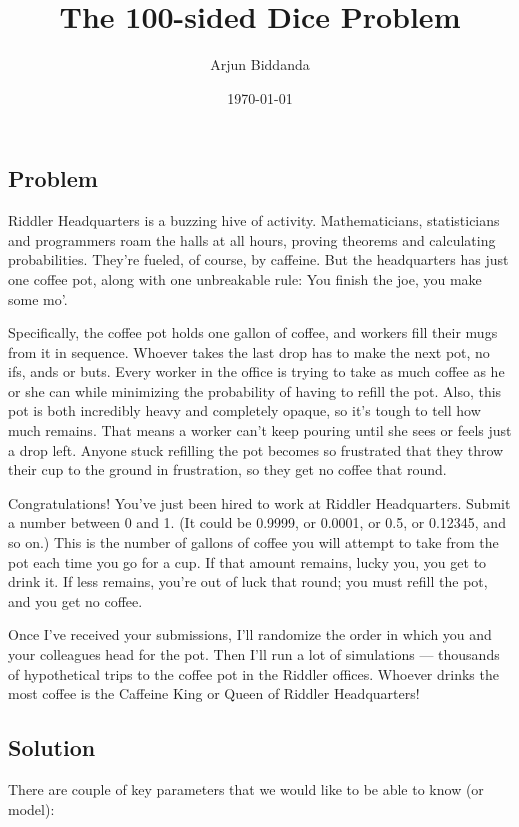 \documentclass[12pt]{article}
\title{The 100-sided Dice Problem}
\author{Arjun Biddanda}
\date{\today}
\begin{document}
\maketitle
\linenumbers

\subsection*{Problem}

Riddler Headquarters is a buzzing hive of activity. Mathematicians, statisticians and programmers roam the halls at all hours, proving theorems and calculating probabilities. They’re fueled, of course, by caffeine. But the headquarters has just one coffee pot, along with one unbreakable rule: You finish the joe, you make some mo’.

Specifically, the coffee pot holds one gallon of coffee, and workers fill their mugs from it in sequence. Whoever takes the last drop has to make the next pot, no ifs, ands or buts. Every worker in the office is trying to take as much coffee as he or she can while minimizing the probability of having to refill the pot. Also, this pot is both incredibly heavy and completely opaque, so it’s tough to tell how much remains. That means a worker can’t keep pouring until she sees or feels just a drop left. Anyone stuck refilling the pot becomes so frustrated that they throw their cup to the ground in frustration, so they get no coffee that round.

Congratulations! You’ve just been hired to work at Riddler Headquarters. Submit a number between 0 and 1. (It could be 0.9999, or 0.0001, or 0.5, or 0.12345, and so on.) This is the number of gallons of coffee you will attempt to take from the pot each time you go for a cup. If that amount remains, lucky you, you get to drink it. If less remains, you’re out of luck that round; you must refill the pot, and you get no coffee.

Once I’ve received your submissions, I’ll randomize the order in which you and your colleagues head for the pot. Then I’ll run a lot of simulations — thousands of hypothetical trips to the coffee pot in the Riddler offices. Whoever drinks the most coffee is the Caffeine King or Queen of Riddler Headquarters!


\subsection*{Solution}

There are couple of key parameters that we would like to be able to know (or model):
\end{document}
